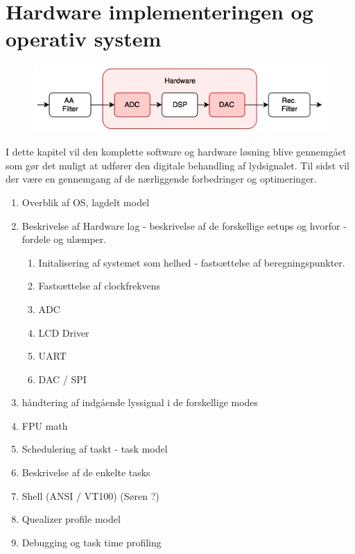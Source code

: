 \chapter{Hardware implementeringen og operativ system}\label{kap:hardware}

\begin{figure}[h]
	\centering
	\includegraphics[width=15cm]{billeder/flow_hardware}
	\centering	
\end{figure}

I dette kapitel vil den komplette software og hardware løsning blive gennemgået som gør det muligt at udfører den digitale behandling af lydsignalet.
Til sidst vil der være en gennemgang af de nærliggende forbedringer og optimeringer.


\begin{enumerate}
	\item Overblik af OS, lagdelt model
	\item Beskrivelse af Hardware lag - beskrivelse af de forskellige setups og hvorfor - fordele og ulæmper.
	\begin{enumerate}
		\item Initalisering af systemet som helhed - fastsættelse af beregningspunkter.
		\item Fastsættelse af clockfrekvens
		\item ADC
		\item LCD Driver 
		\item UART
		\item DAC / SPI
	\end{enumerate}
	\item håndtering af indgående lyssignal i de forskellige modes
	\item FPU math
	\item Schedulering af taskt - task model 
	\item Beskrivelse af de enkelte tasks
	\item Shell (ANSI / VT100) (Søren ?) 
	\item Quealizer profile model
	\item Debugging og task time profiling
	
\end{enumerate}


